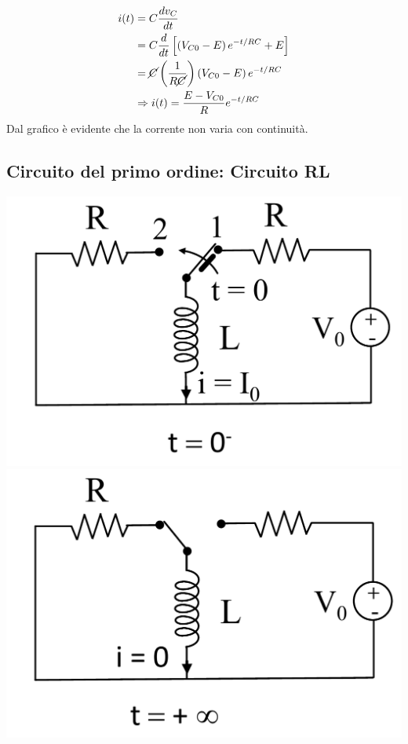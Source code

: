 \documentclass{article}
\begin{document}
\begin{align*}
    i(t) &= C \frac{dv_C}{dt}\\ 
    &= C \frac{d}{dt} \left[ \left(V_{C0}-E\right) e^{-t/RC}+E \right]\\
    &= \cancel{C} \left(\frac{1}{R \cancel{C}}\right) \left(V_{C0}-E\right)e^{-t/RC}\\
    &\Rightarrow i(t) = \frac{E-V_{C0}}{R} e^{-t/RC}
\end{align*}
Dal grafico è evidente che la corrente non varia con continuità.


\subsection{Circuito del primo ordine: Circuito RL}
\begin{center}
    \includegraphics[scale=0.18]{Image/RL_0.png}
    \includegraphics[scale=0.18]{Image/RL_1.png}
\end{center}
\end{document}

